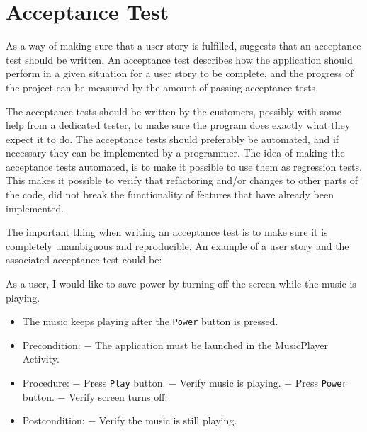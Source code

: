 \section{Acceptance Test}
As a way of making sure that a user story is fulfilled, \citet[p. 126]{xp:explored} suggests that an acceptance test should be written. An acceptance test describes how the application should perform in a given situation for a user story to be complete, and the progress of the project can be measured by the amount of passing acceptance tests.

The acceptance tests should be written by the customers, possibly with some help from a dedicated tester, to make sure the program does exactly what they expect it to do. The acceptance tests should preferably be automated, and if necessary they can be implemented by a programmer. The idea of making the acceptance tests automated, is to make it possible to use them as regression tests. This makes it possible to verify that refactoring and/or changes to other parts of the code, did not break the functionality of features that have already been implemented.

The important thing when writing an acceptance test is to make sure it is completely unambiguous and reproducible. An example of a user story and the associated acceptance test could be:

{As a user, I would like to save power by turning off the screen while the music is playing.}
{\begin{itemize}
\item The music keeps playing after the \texttt{Power} button is pressed.
\end{itemize}}
{\begin{itemize}
\item Precondition: 
\subitem $-$ The application must be launched in the MusicPlayer Activity.

\item Procedure:
\subitem $-$ Press \texttt{Play} button.
\subitem $-$ Verify music is playing.
\subitem $-$ Press \texttt{Power} button.
\subitem $-$ Verify screen turns off.

\item Postcondition:
\subitem $-$ Verify the music is still playing.
\end{itemize}}


